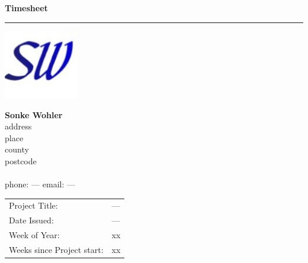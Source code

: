 \documentclass{letter}
\begin{document}
  \hfill \LARGE \textbf{Timesheet}  \normalsize 
  \color{myBlue}  \rule{\textwidth}{3pt}  \color{black}
  \vspace{3pt}

  \begin{minipage}{0.2\textwidth}
    \includegraphics[height=3cm]{myLogo.jpg} 
  \end{minipage}
  \hspace{0.5cm}
  \begin{minipage}{0.4\textwidth}
    \Large
    \textbf{Sonke Wohler}  \vspace{3pt}  \\
    \large
    address  \\
    place  \\
    county  \vspace{2pt}  \\
    postcode  \\\\
    phone: ---
    email: ---
  \end{minipage}
  \hfill
  \begin{minipage}{0.1\textwidth}
  \end{minipage}

  \vspace{20pt}

  \begin{tabular}{ p{}  p{} }
    Project Title: & ---  \vspace{3pt}   \\
    Date Issued: & ---       \vspace{3pt}  \\ 
    Week of Year: & xx  \vspace{3pt}  \\
    Weeks since Project start: & xx
  \end{tabular}

  \vspace{20pt}  \hfill
\end{document}
